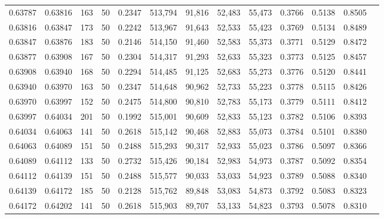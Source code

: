 \begin{tabular}{rrrrrrrrrrrrr}
0.63787 & 0.63816 &   163 &  50 &                                     0.2347 & 513,794 &  91,816 &  52,483 &  55,473 & 0.3766 & 0.5138 & 0.8505 \\
0.63816 & 0.63847 &   173 &  50 &                                     0.2242 & 513,967 &  91,643 &  52,533 &  55,423 & 0.3769 & 0.5134 & 0.8489 \\
0.63847 & 0.63876 &   183 &  50 &                                     0.2146 & 514,150 &  91,460 &  52,583 &  55,373 & 0.3771 & 0.5129 & 0.8472 \\
0.63877 & 0.63908 &   167 &  50 &                                     0.2304 & 514,317 &  91,293 &  52,633 &  55,323 & 0.3773 & 0.5125 & 0.8457 \\
0.63908 & 0.63940 &   168 &  50 &                                     0.2294 & 514,485 &  91,125 &  52,683 &  55,273 & 0.3776 & 0.5120 & 0.8441 \\
0.63940 & 0.63970 &   163 &  50 &                                     0.2347 & 514,648 &  90,962 &  52,733 &  55,223 & 0.3778 & 0.5115 & 0.8426 \\
0.63970 & 0.63997 &   152 &  50 &                                     0.2475 & 514,800 &  90,810 &  52,783 &  55,173 & 0.3779 & 0.5111 & 0.8412 \\
0.63997 & 0.64034 &   201 &  50 &                                     0.1992 & 515,001 &  90,609 &  52,833 &  55,123 & 0.3782 & 0.5106 & 0.8393 \\
0.64034 & 0.64063 &   141 &  50 &                                     0.2618 & 515,142 &  90,468 &  52,883 &  55,073 & 0.3784 & 0.5101 & 0.8380 \\
0.64063 & 0.64089 &   151 &  50 &                                     0.2488 & 515,293 &  90,317 &  52,933 &  55,023 & 0.3786 & 0.5097 & 0.8366 \\
0.64089 & 0.64112 &   133 &  50 &                                     0.2732 & 515,426 &  90,184 &  52,983 &  54,973 & 0.3787 & 0.5092 & 0.8354 \\
0.64112 & 0.64139 &   151 &  50 &                                     0.2488 & 515,577 &  90,033 &  53,033 &  54,923 & 0.3789 & 0.5088 & 0.8340 \\
0.64139 & 0.64172 &   185 &  50 &                                     0.2128 & 515,762 &  89,848 &  53,083 &  54,873 & 0.3792 & 0.5083 & 0.8323 \\
0.64172 & 0.64202 &   141 &  50 &                                     0.2618 & 515,903 &  89,707 &  53,133 &  54,823 & 0.3793 & 0.5078 & 0.8310 \\

\end{tabular}
